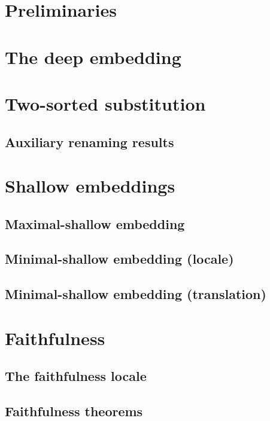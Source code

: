 \documentclass[11pt,a4paper]{article}
\begin{document}
\section{Preliminaries}


\section{The deep embedding}


\section{Two-sorted substitution}

\subsection{Auxiliary renaming results}


\section{Shallow embeddings}
\subsection{Maximal-shallow embedding}

\subsection{Minimal-shallow embedding (locale)}

\subsection{Minimal-shallow embedding (translation)}


\section{Faithfulness}
\subsection{The faithfulness locale}

\subsection{Faithfulness theorems}

\end{document}
